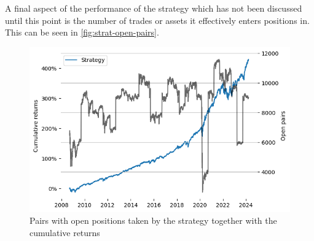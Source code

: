 
A final aspect of the performance of the strategy which has not been discussed until this point is the number of trades or assets it effectively enters positions in. This can be seen in \autoref{fig:strat-open-pairs}.

\begin{figure}[ht]
    \captionsetup{justification=centering}
    \includegraphics[width=\linewidth]{assets/strat-open-pairs.png}
    \caption{Pairs with open positions taken by the strategy together with the cumulative returns}
    \label{fig:strat-open-pairs}
\end{figure}

